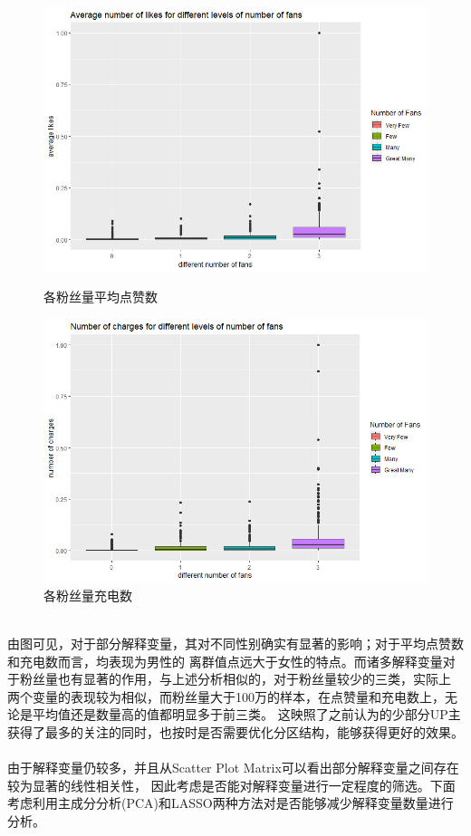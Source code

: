 \documentclass{ctexart}
\begin{document}
\begin{figure}[htbp]
    \begin{minipage}[t]{0.48\textwidth}
        \centering
        \includegraphics[width=\textwidth]{EDA/av_like_fans_boxplot.png}
        \caption{各粉丝量平均点赞数}
    \end{minipage}
    \begin{minipage}[t]{0.48\textwidth}
        \centering
        \includegraphics[width=\textwidth]{EDA/num_charge_fan_boxplot.png}
        \caption{各粉丝量充电数}
    \end{minipage}
\end{figure}\\
\indent 由图可见，对于部分解释变量，其对不同性别确实有显著的影响；对于平均点赞数和充电数而言，均表现为男性的
离群值点远大于女性的特点。而诸多解释变量对于粉丝量也有显著的作用，与上述分析相似的，对于粉丝量较少的三类，实际上
两个变量的表现较为相似，而粉丝量大于100万的样本，在点赞量和充电数上，无论是平均值还是数量高的值都明显多于前三类。
这映照了之前认为的少部分UP主获得了最多的关注的同时，也按时是否需要优化分区结构，能够获得更好的效果。\\
\\
\indent 由于解释变量仍较多，并且从Scatter Plot Matrix可以看出部分解释变量之间存在较为显著的线性相关性，
因此考虑是否能对解释变量进行一定程度的筛选。下面考虑利用主成分分析(PCA)和LASSO两种方法对是否能够减少解释变量数量进行分析。
\end{document}

